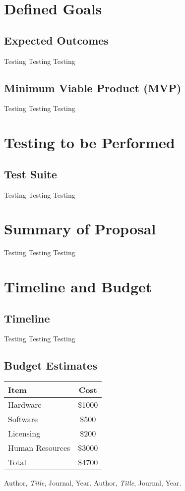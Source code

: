 \documentclass{report}
\begin{document}
\chapter{Defined Goals}
\section{Expected Outcomes}
Testing Testing Testing
\section{Minimum Viable Product (MVP)}
Testing Testing Testing

\chapter{Testing to be Performed}
\section{Test Suite}
Testing Testing Testing

\chapter{Summary of Proposal}
Testing Testing Testing

\chapter{Timeline and Budget}
\section{Timeline}
Testing Testing Testing
\section{Budget Estimates}
\begin{tabular}{|l|c|}
\hline
Item & Cost \\
\hline
Hardware & \$1000 \\
Software & \$500 \\
Licensing & \$200 \\
Human Resources & \$3000 \\
\hline
Total & \$4700 \\
\hline
\end{tabular}

\begin{thebibliography}{9}
 Author, \textit{Title}, Journal, Year.
 Author, \textit{Title}, Journal, Year.
\end{thebibliography}
\end{document}
